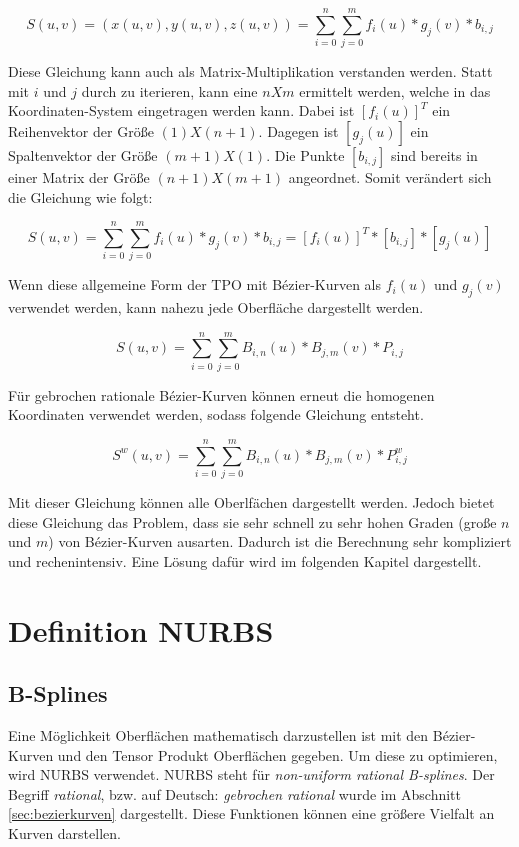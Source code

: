 \documentclass[11pt]{article}
\begin{document}
\begin{equation}
S(u,v) = (x(u,v), y(u,v), z(u,v)) = \sum_{i=0}^{n} \sum_{j=0}^{m} f_{i}(u) * g_{j}(v) * b_{i,j} 
\end{equation}

Diese Gleichung kann auch als Matrix-Multiplikation verstanden werden. 
Statt mit $i$ und $j$ durch zu iterieren, kann eine $n X m$ ermittelt werden, welche in das Koordinaten-System eingetragen werden kann.
Dabei ist $[f_{i}(u)]^{T}$ ein Reihenvektor der Größe  $(1) X (n+1)$.
Dagegen ist $[g_{j}(u)]$ ein Spaltenvektor der Größe $(m+1) X (1)$.
Die Punkte $[b_{i,j}]$ sind bereits in einer Matrix der Größe $(n+1) X (m+1)$ angeordnet. 
Somit verändert sich die Gleichung wie folgt: 

\begin{equation}
S(u,v) = \sum_{i=0}^{n} \sum_{j=0}^{m} f_{i}(u) * g_{j}(v) * b_{i,j}  = [f_{i}(u)]^{T} * [b_{i,j}] * [g_{j}(u)]
\end{equation}

Wenn diese allgemeine Form der TPO mit Bézier-Kurven als $f_{i}(u)$ und $g_{j}(v)$ verwendet werden, kann nahezu jede Oberfläche dargestellt werden. 

\begin{equation}
S(u,v) = \sum_{i=0}^{n} \sum_{j=0}^{m} B_{i,n}(u) * B_{j,m} (v) * P_{i,j}
\end{equation}

Für gebrochen rationale Bézier-Kurven können erneut die homogenen Koordinaten verwendet werden, sodass folgende Gleichung entsteht. 

\begin{equation}
S^{w}(u,v) =  \sum_{i=0}^{n} \sum_{j=0}^{m} B_{i,n}(u) * B_{j,m} (v) * P^{w}_{i,j}
\end{equation}

Mit dieser Gleichung können alle Oberlfächen dargestellt werden. 
Jedoch bietet diese Gleichung das Problem, dass sie sehr schnell zu sehr hohen Graden (große $n$ und $m$) von Bézier-Kurven ausarten.
Dadurch ist die Berechnung sehr kompliziert und rechenintensiv. 
Eine Lösung dafür wird im folgenden Kapitel dargestellt. 

\section{Definition NURBS}
\label{sec:definitionnurbs}
\subsection{B-Splines}
\label{sec:bsplines}
Eine Möglichkeit Oberflächen mathematisch darzustellen ist mit den Bézier-Kurven und den Tensor Produkt Oberflächen gegeben.
Um diese zu optimieren, wird NURBS verwendet.
NURBS steht für \emph{non-uniform rational B-splines}.
Der Begriff \emph{rational}, bzw. auf Deutsch: \emph{gebrochen rational} wurde im Abschnitt \ref{sec:bezierkurven} dargestellt. 
Diese Funktionen können eine größere Vielfalt an Kurven darstellen. 
\end{document}
